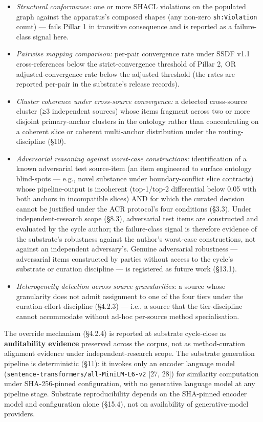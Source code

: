 \documentclass[
]{article}
\providecommand{\tightlist}{%
  \setlength{\itemsep}{0pt}\setlength{\parskip}{0pt}}
\begin{document}
\begin{itemize}
\tightlist
\item
  \emph{Structural conformance:} one or more SHACL violations on the
  populated graph against the apparatus's composed shapes (any non-zero
  \texttt{sh:Violation} count) --- fails Pillar 1 in transitive
  consequence and is reported as a failure-class signal here.
\item
  \emph{Pairwise mapping comparison:} per-pair convergence rate under
  SSDF v1.1 cross-references below the strict-convergence threshold of
  Pillar 2, OR adjusted-convergence rate below the adjusted threshold
  (the rates are reported per-pair in the substrate's release records).
\item
  \emph{Cluster coherence under cross-source convergence:} a detected
  cross-source cluster (≥3 independent sources) whose items fragment
  across two or more disjoint primary-anchor clusters in the ontology
  rather than concentrating on a coherent slice or coherent multi-anchor
  distribution under the routing-discipline (§10).
\item
  \emph{Adversarial reasoning against worst-case constructions:}
  identification of a known adversarial test source-item (an item
  engineered to surface ontology blind-spots --- e.g., novel substance
  under boundary-conflict slice contracts) whose pipeline-output is
  incoherent (top-1/top-2 differential below 0.05 with both anchors in
  incompatible slices) AND for which the curated decision cannot be
  justified under the ACR protocol's four conditions (§3.3). Under
  independent-research scope (§8.3), adversarial test items are
  constructed and evaluated by the cycle author; the failure-class
  signal is therefore evidence of the substrate's robustness against the
  author's worst-case constructions, not against an independent
  adversary's. Genuine adversarial robustness --- adversarial items
  constructed by parties without access to the cycle's substrate or
  curation discipline --- is registered as future work (§13.1).
\item
  \emph{Heterogeneity detection across source granularities:} a source
  whose granularity does not admit assignment to one of the four tiers
  under the curation-effort discipline (§4.2.3) --- i.e., a source that
  the tier-discipline cannot accommodate without ad-hoc per-source
  method specialisation.
\end{itemize}

The override mechanism (§4.2.4) is reported at substrate cycle-close as
\textbf{auditability evidence} preserved across the corpus, not as
method-curation alignment evidence under independent-research scope. The
substrate generation pipeline is deterministic (§11): it invokes only an
encoder language model (\texttt{sentence-transformers/all-MiniLM-L6-v2}
{[}27, 28{]}) for similarity computation under SHA-256-pinned
configuration, with no generative language model at any pipeline stage.
Substrate reproducibility depends on the SHA-pinned encoder model and
configuration alone (§15.4), not on availability of generative-model
providers.
\end{document}

